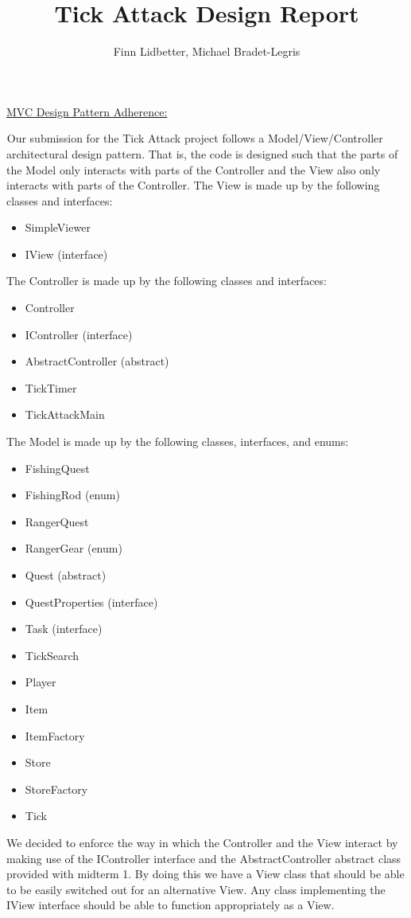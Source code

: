 \documentclass[letter paper, 12pt]{article}
\newcommand{\tab}{${}_{}$\hspace{0.2in}}
\newcommand{\noin}{\noindent}
\begin{document}
\title{Tick Attack Design Report}
\author{Finn Lidbetter, Michael Bradet-Legris}
\maketitle
\noin \underline{MVC Design Pattern Adherence:}\vspace{5pt}

\tab Our submission for the Tick Attack project follows a Model/View/Controller architectural design pattern. That is, the code is designed such that the parts of the Model only interacts with parts of the Controller and the View also only interacts with parts of the Controller. 
The View is made up by the following classes and interfaces: 
\begin{itemize}
	\item SimpleViewer
	\item IView (interface)
\end{itemize} 
The Controller is made up by the following classes and interfaces:
\begin{itemize}
	\item Controller
	\item IController (interface)
	\item AbstractController (abstract)
	\item TickTimer
	\item TickAttackMain
\end{itemize}
The Model is made up by the following classes, interfaces, and enums:
\begin{itemize}
	\item FishingQuest
	\item FishingRod (enum)
	\item RangerQuest
	\item RangerGear (enum)
	\item Quest (abstract)
	\item QuestProperties (interface)
	\item Task (interface)
	\item TickSearch
	\item Player
	\item Item
	\item ItemFactory
	\item Store
	\item StoreFactory
	\item Tick
\end{itemize}
We decided to enforce the way in which the Controller and the View interact by making use of the IController interface and the AbstractController abstract class provided with midterm 1. By doing this we have a View class that should be able to be easily switched out for an alternative View. Any class implementing the IView interface should be able to function appropriately as a View.\\
\end{document}
